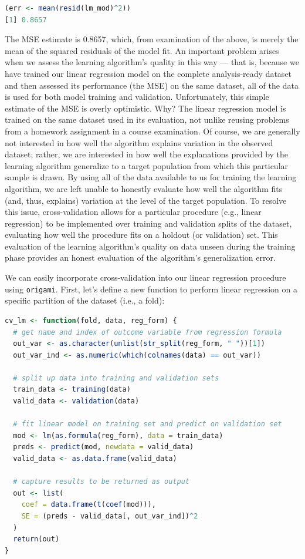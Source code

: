 \documentclass[
  12pt, krantz2,
]{krantz}
\newcommand{\passthrough}[1]{#1}
\newcommand{\1}{\mathbbm{1}}
\theoremstyle{definition}
\theoremstyle{definition}
\theoremstyle{definition}
\theoremstyle{definition}
\theoremstyle{remark}
\begin{document}
\begin{lstlisting}[language=R]
(err <- mean(resid(lm_mod)^2))
[1] 0.8657
\end{lstlisting}

The MSE estimate is 0.8657, which, from examination of the above, is merely the
mean of the squared residuals of the model fit. An important problem arises
when we assess the learning algorithm's quality in this way --- that is, because
we have trained our linear regression model on the complete analysis-ready
dataset and then assessed its performance (the MSE) on the same dataset, all of
the data is used for both model training and validation. Unfortunately, this
simple estimate of the MSE is overly optimistic. Why? The linear regression
model is trained on the same dataset used in its evaluation, not unlike reusing
problems from a homework assignment in a course examination. Of course, we are
generally not interested in how well the algorithm explains variation in the
observed dataset; rather, we are interested in how well the explanations
provided by the learning algorithm generalize to a target population from which
this particular sample is drawn. By using all of the data available to us for
training the learning algorithm, we are left unable to honestly evaluate how
well the algorithm fits (and, thus, explains) variation at the level of the
target population.
To resolve this issue, cross-validation allows for a particular procedure (e.g.,
linear regression) to be implemented over training and validation splits of the
dataset, evaluating how well the procedure fits on a holdout (or validation)
set. This evaluation of the learning algorithm's quality on data unseen during
the training phase provides an honest evaluation of the algorithm's
generalization error.

We can easily incorporate cross-validation into our linear regression procedure
using \passthrough{\lstinline!origami!}. First, let's define a new function to perform linear regression
on a specific partition of the dataset (i.e., a fold):

\begin{lstlisting}[language=R]
cv_lm <- function(fold, data, reg_form) {
  # get name and index of outcome variable from regression formula
  out_var <- as.character(unlist(str_split(reg_form, " "))[1])
  out_var_ind <- as.numeric(which(colnames(data) == out_var))

  # split up data into training and validation sets
  train_data <- training(data)
  valid_data <- validation(data)

  # fit linear model on training set and predict on validation set
  mod <- lm(as.formula(reg_form), data = train_data)
  preds <- predict(mod, newdata = valid_data)
  valid_data <- as.data.frame(valid_data)

  # capture results to be returned as output
  out <- list(
    coef = data.frame(t(coef(mod))),
    SE = (preds - valid_data[, out_var_ind])^2
  )
  return(out)
}
\end{lstlisting}
\end{document}
